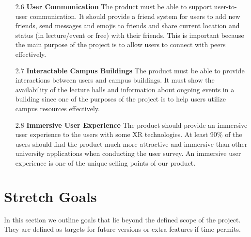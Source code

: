 \documentclass{article}
\begin{document}
\begin{itemize}
    \item[2.6] \textbf{User Communication} The product must be able to support user-to-user communication. It should provide a friend system for users to add new friends, send messages and emojis to friends and share current location and status (in lecture/event or free) with their friends. This is important because the main purpose of the project is to allow users to connect with peers effectively.

    \item[2.7] \textbf{Interactable Campus Buildings} The product must be able to provide interactions between users and campus buildings. It must show the availability of the lecture halls and information about ongoing events in a building since one of the purposes of the project is to help users utilize campus resources effectively.

    \item[2.8] \textbf{Immersive User Experience} The product should provide an immersive user experience to the users with some XR technologies. At least 90\% of the users should find the product much more attractive and immersive than other university applications when conducting the user survey. An immersive user experience is one of the unique selling points of our product.
\end{itemize}

\section{Stretch Goals}

In this section we outline goals that lie beyond the defined scope of the project. They are defined as targets for future versions or extra features if time permits.
\end{document}
